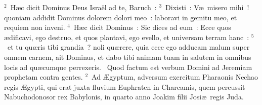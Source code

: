 ${}^{2}$~H\ae c dicit Dominus Deus Isra\"el ad te, Baruch~:
${}^{3}$~Dixisti~: V\ae\ misero mihi~! quoniam addidit Dominus dolorem dolori meo~: laboravi in gemitu meo, et requiem non inveni.
${}^{4}$~H\ae c dicit Dominus~: Sic dices ad eum~: Ecce quos \ae dificavi, ego destruo, et quos plantavi, ego evello, et universam terram hanc~:
${}^{5}$~et tu qu\ae ris tibi grandia~? noli qu\ae rere, quia ecce ego adducam malum super omnem carnem, ait Dominus, et dabo tibi animam tuam in salutem in omnibus locis ad qu\ae cumque perrexeris.
~\lettrine[lines=10,image=true,loversize=0.05,lraise=-0.03]{Q}{}uod factum est verbum Domini ad Jeremiam prophetam contra gentes.
${}^{2}$~Ad \AE gyptum, adversum exercitum Pharaonis Nechao regis \AE gypti, qui erat juxta fluvium Euphraten in Charcamis, quem percussit Nabuchodonosor rex Babylonis, in quarto anno Joakim filii Josi\ae\ regis Juda.
